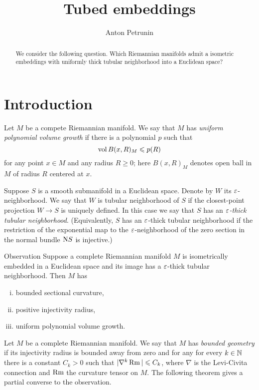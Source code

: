\documentclass[a4paper,10pt]{article}
\def\thetitle{Tubed embeddings}
\def\theauthors{Anton Petrunin}
\begin{document}


\title{\thetitle}
\author{\theauthors}
\date{}
\maketitle

\begin{abstract}
We consider the following question.
Which Riemannian manifolds admit a isometric embeddings with uniformly thick tubular neighborhood into 
a Euclidean space?
\end{abstract}

\section{Introduction}

Let $M$ be a compete Riemannian manifold.
We say that $M$ has \label{uniform polynomial volume growth} \emph{uniform 
polynomial volume growth} if there is a polynomial $p$ such that 
\[\operatorname{\rm vol} B(x,R)_M\leqslant p(R)\]
for any point $x\in M$ and any radius $R\ge 0$;
here $B(x,R)_M$ denotes open ball in $M$ of radius $R$ centered at $x$.

Suppose $S$ is a smooth submanifold in a Euclidean space.
Denote by $W$ its $\varepsilon$-neighborhood.
We say that $W$ is tubular neighborhood of $S$ if the closest-point projection $W\to S$ is uniquely defined.
In this case we say that $S$ has an \emph{$\varepsilon$-thick tubular neighborhood}.
(Equivalently, $S$ has an $\varepsilon$-thick tubular neighborhood if the restriction of the exponential map to the $\varepsilon$-neighborhood of the zero section in the normal bundle $\mathrm{N} S$ is injective.)

\begin{thm}{Observation}
Suppose a complete Riemannian manifold $M$ is isometrically embedded in a Euclidean space
and its image has a $\varepsilon$-thick tubular neighborhood.
Then $M$ has
\begin{enumerate}[(i)]
\item bounded sectional curvature,
\item positive injectivity radius,
\item\label{uniform polynomial volume growth} uniform polynomial volume growth.
\end{enumerate}
\end{thm}

Let $M$ be a complete Riemannian manifold. 
We say that $M$ has \emph{bounded geometry} if its injectivity radius is bounded away from zero and for any for every $k\in\mathbb{N}$ there is a constant $C_k > 0$ such that $|\nabla^k \operatorname{\rm Rm}| \leqslant C_k$, where $\nabla$ is the Levi-Civita connection and $\operatorname{\rm Rm}$ the curvature tensor on $M$.
The following theorem gives a partial converse to the observation.
\end{document}
